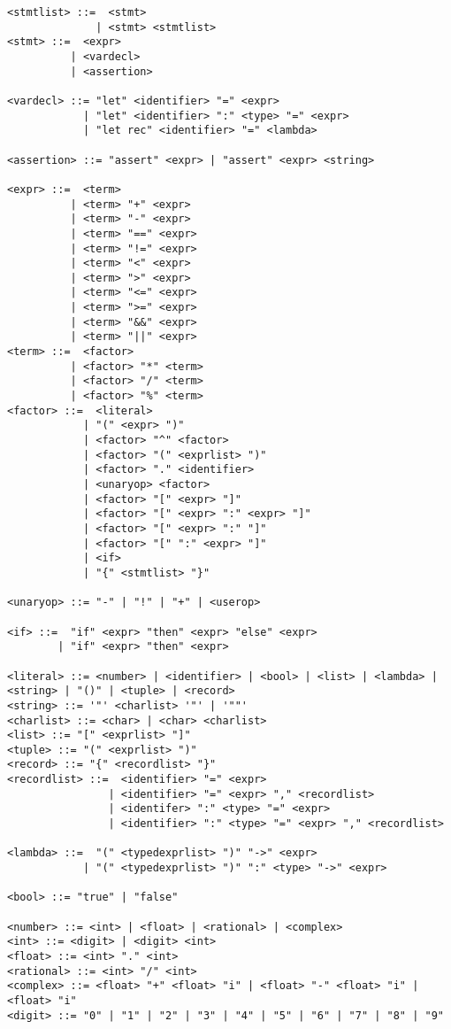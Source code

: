 \begin{verbatim}
<stmtlist> ::=  <stmt> 
              | <stmt> <stmtlist>
<stmt> ::=  <expr> 
          | <vardecl>
          | <assertion>
          
<vardecl> ::= "let" <identifier> "=" <expr>
            | "let" <identifier> ":" <type> "=" <expr>
            | "let rec" <identifier> "=" <lambda>
            
<assertion> ::= "assert" <expr> | "assert" <expr> <string>

<expr> ::=  <term> 
          | <term> "+" <expr> 
          | <term> "-" <expr>
          | <term> "==" <expr>
          | <term> "!=" <expr>
          | <term> "<" <expr>
          | <term> ">" <expr>
          | <term> "<=" <expr>
          | <term> ">=" <expr>
          | <term> "&&" <expr>
          | <term> "||" <expr>
<term> ::=  <factor> 
          | <factor> "*" <term> 
          | <factor> "/" <term> 
          | <factor> "%" <term> 
<factor> ::=  <literal> 
            | "(" <expr> ")" 
            | <factor> "^" <factor>
            | <factor> "(" <exprlist> ")"
            | <factor> "." <identifier>
            | <unaryop> <factor>
            | <factor> "[" <expr> "]"
            | <factor> "[" <expr> ":" <expr> "]"
            | <factor> "[" <expr> ":" "]"
            | <factor> "[" ":" <expr> "]"
            | <if>
            | "{" <stmtlist> "}"

<unaryop> ::= "-" | "!" | "+" | <userop>

<if> ::=  "if" <expr> "then" <expr> "else" <expr>
        | "if" <expr> "then" <expr>

<literal> ::= <number> | <identifier> | <bool> | <list> | <lambda> | <string> | "()" | <tuple> | <record>
<string> ::= '"' <charlist> '"' | '""'
<charlist> ::= <char> | <char> <charlist>
<list> ::= "[" <exprlist> "]"
<tuple> ::= "(" <exprlist> ")"
<record> ::= "{" <recordlist> "}"
<recordlist> ::=  <identifier> "=" <expr> 
                | <identifier> "=" <expr> "," <recordlist>
                | <identifer> ":" <type> "=" <expr> 
                | <identifier> ":" <type> "=" <expr> "," <recordlist>
            
<lambda> ::=  "(" <typedexprlist> ")" "->" <expr>
            | "(" <typedexprlist> ")" ":" <type> "->" <expr>

<bool> ::= "true" | "false"
            
<number> ::= <int> | <float> | <rational> | <complex>
<int> ::= <digit> | <digit> <int>
<float> ::= <int> "." <int>
<rational> ::= <int> "/" <int>
<complex> ::= <float> "+" <float> "i" | <float> "-" <float> "i" | <float> "i"
<digit> ::= "0" | "1" | "2" | "3" | "4" | "5" | "6" | "7" | "8" | "9"


\end{verbatim}
